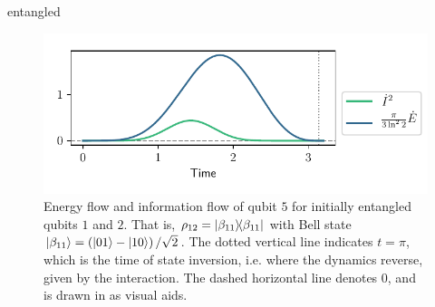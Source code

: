 \documentclass[10pt]{beamer}
\begin{document}
\begin{frame}{entangled}
    \begin{figure}[H]
        \centering
        \includegraphics[width=\textwidth]{alltheplots/bell/pendry_grey_lines.pdf}
        \caption{Energy flow and information flow of qubit $5$ for 
        initially entangled qubits $1$ and $2$.
        That is, $\rho_{12} = \dyad{\beta_{11}}$ with Bell state $\ket{\beta_{11}} = \left(\ket{01}-\ket{10}\right)/\sqrt{2}$.
        The dotted vertical line indicates $t=\pi$, which is the time of state inversion, i.e. where the dynamics reverse,
        given by the interaction.
        The dashed horizontal line denotes $0$, and is drawn in as visual aids.}
        \label{fig:bell_pendry}
    \end{figure}
\end{frame}
\end{document}
